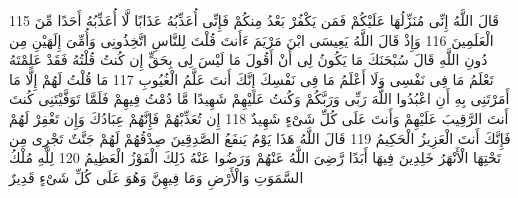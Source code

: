 {\tiny\colorbox{cl_aya}{115}} قَالَ اللَّهُ إِنِّى مُنَزِّلُهَا عَلَيْكُمْ فَمَن يَكْفُرْ بَعْدُ مِنكُمْ فَإِنِّى أُعَذِّبُهُ عَذَابًا لَّا أُعَذِّبُهُ أَحَدًا مِّنَ الْعَلَمِينَ
{\tiny\colorbox{cl_aya}{116}} وَإِذْ قَالَ اللَّهُ يَعِيسَى ابْنَ مَرْيَمَ ءَأَنتَ قُلْتَ لِلنَّاسِ اتَّخِذُونِى وَأُمِّىَ إِلَهَيْنِ مِن دُونِ اللَّهِ قَالَ سُبْحَنَكَ مَا يَكُونُ لِى أَنْ أَقُولَ مَا لَيْسَ لِى بِحَقٍّ إِن كُنتُ قُلْتُهُ فَقَدْ عَلِمْتَهُ تَعْلَمُ مَا فِى نَفْسِى وَلَا أَعْلَمُ مَا فِى نَفْسِكَ إِنَّكَ أَنتَ عَلَّمُ الْغُيُوبِ
{\tiny\colorbox{cl_aya}{117}} مَا قُلْتُ لَهُمْ إِلَّا مَا أَمَرْتَنِى بِهِ أَنِ اعْبُدُوا اللَّهَ رَبِّى وَرَبَّكُمْ وَكُنتُ عَلَيْهِمْ شَهِيدًا مَّا دُمْتُ فِيهِمْ فَلَمَّا تَوَفَّيْتَنِى كُنتَ أَنتَ الرَّقِيبَ عَلَيْهِمْ وَأَنتَ عَلَى كُلِّ شَىْءٍ شَهِيدٌ
{\tiny\colorbox{cl_aya}{118}} إِن تُعَذِّبْهُمْ فَإِنَّهُمْ عِبَادُكَ وَإِن تَغْفِرْ لَهُمْ فَإِنَّكَ أَنتَ الْعَزِيزُ الْحَكِيمُ
{\tiny\colorbox{cl_aya}{119}} قَالَ اللَّهُ هَذَا يَوْمُ يَنفَعُ الصَّدِقِينَ صِدْقُهُمْ لَهُمْ جَنَّتٌ تَجْرِى مِن تَحْتِهَا الْأَنْهَرُ خَلِدِينَ فِيهَا أَبَدًا رَّضِىَ اللَّهُ عَنْهُمْ وَرَضُوا عَنْهُ ذَلِكَ الْفَوْزُ الْعَظِيمُ
{\tiny\colorbox{cl_aya}{120}} لِلَّهِ مُلْكُ السَّمَوَتِ وَالْأَرْضِ وَمَا فِيهِنَّ وَهُوَ عَلَى كُلِّ شَىْءٍ قَدِيرٌ
